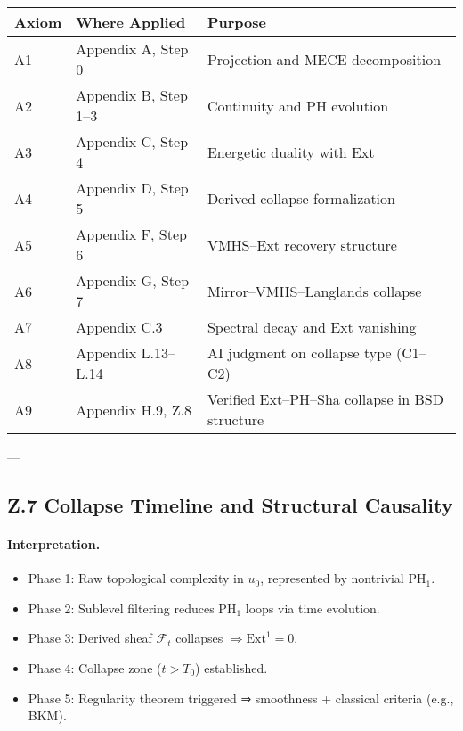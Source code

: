 \documentclass[11pt]{article}
\begin{document}
\begin{axiom}
\begin{axiom}
{{\begin{tabular}{lll}
\textbf{Axiom} & \textbf{Where Applied} & \textbf{Purpose} \\
\hline
A1 & Appendix A, Step 0 & Projection and MECE decomposition \\
A2 & Appendix B, Step 1--3 & Continuity and PH evolution \\
A3 & Appendix C, Step 4 & Energetic duality with Ext \\
A4 & Appendix D, Step 5 & Derived collapse formalization \\
A5 & Appendix F, Step 6 & VMHS–Ext recovery structure \\
A6 & Appendix G, Step 7 & Mirror–VMHS–Langlands collapse \\
A7 & Appendix C.3 & Spectral decay and Ext vanishing \\
A8 & Appendix L.13--L.14 & AI judgment on collapse type (C1–C2) \\
A9 & Appendix H.9, Z.8 & Verified Ext–PH–Sha collapse in BSD structure \\
\end{tabular}

---

\subsection*{Z.7 Collapse Timeline and Structural Causality}

\begin{center}
\end{center}

\vspace{1em}

\paragraph{Interpretation.}
\begin{itemize}
  \item Phase 1: Raw topological complexity in $u_0$, represented by nontrivial $\mathrm{PH}_1$.
  \item Phase 2: Sublevel filtering reduces $\mathrm{PH}_1$ loops via time evolution.
  \item Phase 3: Derived sheaf $\mathcal{F}_t$ collapses $\Rightarrow \mathrm{Ext}^1 = 0$.
  \item Phase 4: Collapse zone ($t > T_0$) established.
  \item Phase 5: Regularity theorem triggered ⇒ smoothness + classical criteria (e.g., BKM).
\end{itemize}

}}
\end{axiom}
\end{axiom}
\end{document}

